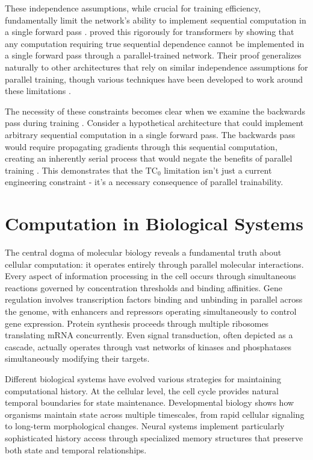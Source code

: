 \documentclass[12pt]{article}
\begin{document}
These independence assumptions, while crucial for training efficiency, fundamentally limit the network's ability to implement sequential computation in a single forward pass \cite{wei2022chain}. \cite{merrill2023parallelism} proved this rigorously for transformers by showing that any computation requiring true sequential dependence cannot be implemented in a single forward pass through a parallel-trained network. Their proof generalizes naturally to other architectures that rely on similar independence assumptions for parallel training, though various techniques have been developed to work around these limitations \cite{stillman2023generative}.

The necessity of these constraints becomes clear when we examine the backwards pass during training \cite{jung2020new}. Consider a hypothetical architecture that could implement arbitrary sequential computation in a single forward pass. The backwards pass would require propagating gradients through this sequential computation, creating an inherently serial process that would negate the benefits of parallel training \cite{zhu2024overcoming}. This demonstrates that the $\text{TC}_0$ limitation isn't just a current engineering constraint - it's a necessary consequence of parallel trainability.

\section{Computation in Biological Systems}

The central dogma of molecular biology reveals a fundamental truth about cellular computation: it operates entirely through parallel molecular interactions. Every aspect of information processing in the cell occurs through simultaneous reactions governed by concentration thresholds and binding affinities. Gene regulation involves transcription factors binding and unbinding in parallel across the genome, with enhancers and repressors operating simultaneously to control gene expression. Protein synthesis proceeds through multiple ribosomes translating mRNA concurrently. Even signal transduction, often depicted as a cascade, actually operates through vast networks of kinases and phosphatases simultaneously modifying their targets.

Different biological systems have evolved various strategies for maintaining computational history. At the cellular level, the cell cycle provides natural temporal boundaries for state maintenance. Developmental biology shows how organisms maintain state across multiple timescales, from rapid cellular signaling to long-term morphological changes. Neural systems implement particularly sophisticated history access through specialized memory structures that preserve both state and temporal relationships.
\end{document}
